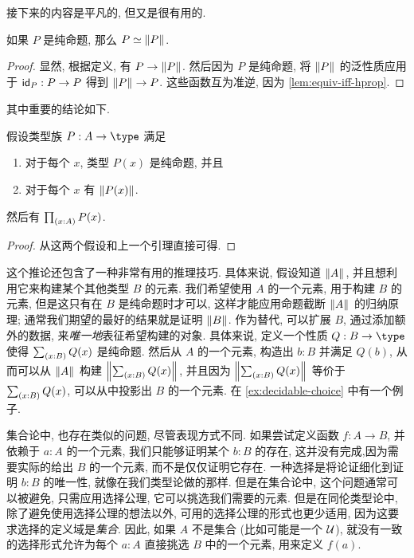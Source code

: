 %
%

接下来的内容是平凡的, 但又是很有用的.

\begin{lem}
    \label{thm:prop-equiv-trunc}
    如果 $P$ 是纯命题, 那么 $\eqv P {\brck P}$.
\end{lem}
\begin{proof}
    显然, 根据定义, 有 $P\to \brck{P}$.
    然后因为 $P$ 是纯命题,  将 $\brck P$ 的泛性质应用于 $\idfunc[P] :P\to P$ 得到 $\brck P \to P$.
    这些函数互为准逆, 因为 \cref{lem:equiv-iff-hprop}.
\end{proof}

其中重要的结论如下.

\begin{cor}
    \label{cor:UC}
    假设类型族 $P:A\to \type$ 满足
    \begin{enumerate}
        \item 对于每个 $x$, 类型 $P(x)$ 是纯命题, 并且
        \item 对于每个 $x$ 有 $\brck {P(x)}$.
    \end{enumerate}
    然后有 $\prd{x:A} P(x)$.
\end{cor}
\begin{proof}
    从这两个假设和上一个引理直接可得.
\end{proof}

这个推论还包含了一种非常有用的推理技巧.
具体来说, 假设知道 $\brck A$, 并且想利用它来构建某个其他类型 $B$ 的元素.
我们希望使用 $A$ 的一个元素, 用于构建 $B$ 的元素, 但是这只有在 $B$ 是纯命题时才可以, 这样才能应用命题截断 $\brck A$ 的归纳原理;
通常我们期望的最好的结果就是证明 $\brck B$.
%
作为替代, 可以扩展 $B$, 通过添加额外的数据, 来\emph{唯一地}表征希望构建的对象.
具体来说, 定义一个性质 $Q:B\to\type$ 使得 $\sm{x:B} Q(x)$ 是纯命题.
然后从 $A$ 的一个元素, 构造出 $b:B$ 并满足 $Q(b)$, 从而可以从 $\brck A$ 构建 $\brck{\sm{x:B} Q(x)}$, 并且因为 $\brck{\sm{x:B} Q(x)}$ 等价于 $\sm{x:B} Q(x)$, 可以从中投影出 $B$ 的一个元素.
在 \cref{ex:decidable-choice} 中有一个例子.

集合论中, 也存在类似的问题, 尽管表现方式不同.
如果尝试定义函数 $f: A \to B$, 并依赖于 $a : A$ 的一个元素, 我们只能够证明某个 $b : B$ 的存在, 这并没有完成,因为需要实际的给出 $B$ 的一个元素, 而不是仅仅证明它存在.
一种选择是将论证细化到证明 $b : B$ 的唯一性, 就像在我们类型论做的那样.
但是在集合论中, 这个问题通常可以被避免, 只需应用选择公理, 它可以挑选我们需要的元素.
但是在同伦类型论中, 除了避免使用选择公理的想法以外, 可用的选择公理的形式也更少适用, 因为这要求选择的定义域是\emph{集合}.
因此, 如果 $A$ 不是集合 (比如可能是一个 $\UU$), 就没有一致的选择形式允许为每个 $a : A$ 直接挑选 $B$ 中的一个元素, 用来定义 $f(a)$.

%

